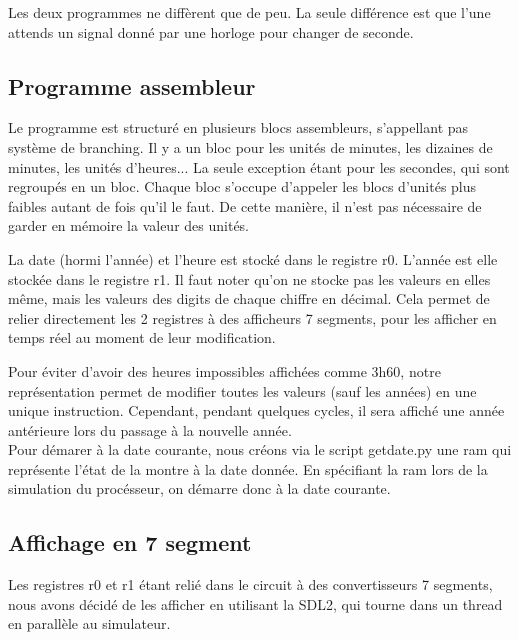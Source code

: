 \documentclass[a4paper]{article}
\begin{document}
Les deux programmes ne diffèrent que de peu. La seule différence est que l'une
attends un signal donné par une horloge pour changer de seconde.

\subsection{Programme assembleur}


Le programme est structuré en plusieurs blocs assembleurs, s'appellant pas
système de branching. Il y a un bloc pour les unités de minutes, les dizaines de
minutes, les unités d'heures... La seule exception étant pour les secondes, qui
sont regroupés en un bloc. Chaque bloc s'occupe d'appeler les blocs d'unités
plus faibles autant de fois qu'il le faut. De cette manière, il n'est pas
nécessaire de garder en mémoire la valeur des unités.

La date (hormi l'année) et l'heure est stocké dans le registre r0. L'année est
elle stockée dans le registre r1. Il faut noter qu'on ne stocke pas les valeurs
en elles même, mais les valeurs des digits de chaque chiffre en décimal. Cela
permet de relier directement les 2 registres à des afficheurs 7 segments, pour
les afficher en temps réel au moment de leur modification.

Pour éviter d'avoir des heures impossibles affichées comme 3h60, notre
représentation permet de modifier toutes les valeurs (sauf les années) en une
unique instruction. Cependant, pendant quelques cycles, il sera affiché une
année antérieure lors du passage à la nouvelle année.\\


Pour démarer à la date courante, nous créons via le script getdate.py une ram
qui représente l'état de la montre à la date donnée. En spécifiant la ram lors
de la simulation du procésseur, on démarre donc à la date courante.


\subsection{Affichage en 7 segment}

Les registres r0 et r1 étant relié dans le circuit à des convertisseurs 7
segments, nous avons décidé de les afficher en utilisant la SDL2, qui tourne
dans un thread en parallèle au simulateur.
\end{document}

